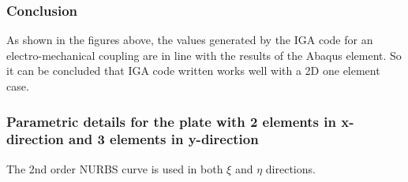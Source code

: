 \documentclass[11pt]{article}
\begin{document}
\subsubsection{Conclusion}
As shown in the figures above, the values generated by the IGA code for an electro-mechanical coupling are in line with the results of the Abaqus element. So it can be concluded that IGA code written works well with a 2D one element case.

\subsubsection{Parametric details for the plate with 2 elements in x-direction and  3 elements in y-direction}
The 2nd order NURBS curve is used in both $\xi$ and $\eta$ directions. \\

\end{document}
